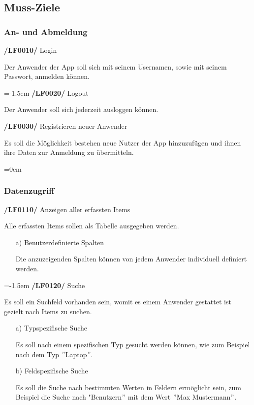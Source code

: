 \documentclass[11pt,a4paper]{report}
\begin{document}
\subsection{Muss-Ziele}
\subsubsection{An- und Abmeldung}
\textbf{/LF0010/} Login
\par
\begingroup
\leftskip=1cm
\noindent Der Anwender der App soll sich mit seinem Usernamen, sowie mit seinem Passwort, anmelden können.\\
\par
\endgroup

\leftskip=-1.5em
\textbf{/LF0020/} Logout
\par
\begingroup
\leftskip=1cm
\noindent Der Anwender soll sich jederzeit ausloggen können.\\
\par
\endgroup

\textbf{/LF0030/} Registrieren neuer Anwender
\par
\begingroup
\leftskip=1cm
\noindent Es soll die Möglichkeit bestehen neue Nutzer der App hinzuzufügen und ihnen ihre Daten zur Anmeldung zu übermitteln.\\
\par
\endgroup

\leftskip=0em
\subsubsection{Datenzugriff}
\textbf{/LF0110/} Anzeigen aller erfassten Items
\par
\begingroup
\leftskip=1cm
\noindent Alle erfassten Items sollen als Tabelle ausgegeben werden.
\begin{enumerate}
\leftskip=3em
\item[a)] Benutzerdefinierte Spalten
\item[] Die anzuzeigenden Spalten können von jedem Anwender individuell definiert werden.
\end{enumerate}
\par
\endgroup

\leftskip=-1.5em
\textbf{/LF0120/} Suche
\par
\begingroup
\leftskip=1cm
\noindent Es soll ein Suchfeld vorhanden sein, womit es einem Anwender gestattet ist gezielt nach Items zu suchen.
\begin{enumerate}
\leftskip=3em
\item[a)] Typspezifische Suche
\item[] Es soll nach einem spezifischen Typ gesucht werden können, wie zum Beispiel nach dem Typ $"$Laptop$"$.
\item[b)]Feldspezifische Suche
\item[] Es soll die Suche nach bestimmten Werten in Feldern ermöglicht sein, zum Beispiel die Suche nach "Benutzern$"$ mit dem Wert $"$Max Mustermann$"$.
\end{enumerate}
\par
\endgroup
\end{document}
